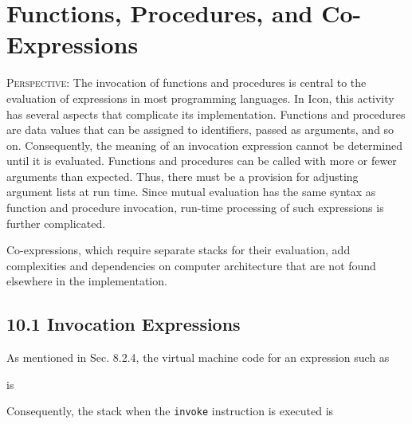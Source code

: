 \chapter{Functions, Procedures, and Co-Expressions}

\textsc{Perspective}: The invocation of functions and procedures is
central to the evaluation of expressions in most programming
languages. In Icon, this activity has several aspects that complicate
its implementation. Functions and procedures are data values that can
be assigned to identifiers, passed as arguments, and so
on. Consequently, the meaning of an invocation expression cannot be
determined until it is evaluated. Functions and procedures can be
called with more or fewer arguments than expected. Thus, there must be
a provision for adjusting argument lists at run time.  Since mutual
evaluation has the same syntax as function and procedure invocation,
run-time processing of such expressions is further complicated.

Co-expressions, which require separate stacks for their evaluation,
add complexities and dependencies on computer architecture that are
not found elsewhere in the implementation.

\section[10.1 Invocation Expressions]{10.1 Invocation Expressions}

As mentioned in Sec. 8.2.4, the virtual machine code for an expression such as


\noindent is

\goodbreak
{}

Consequently, the stack when the \texttt{invoke} instruction is executed is

